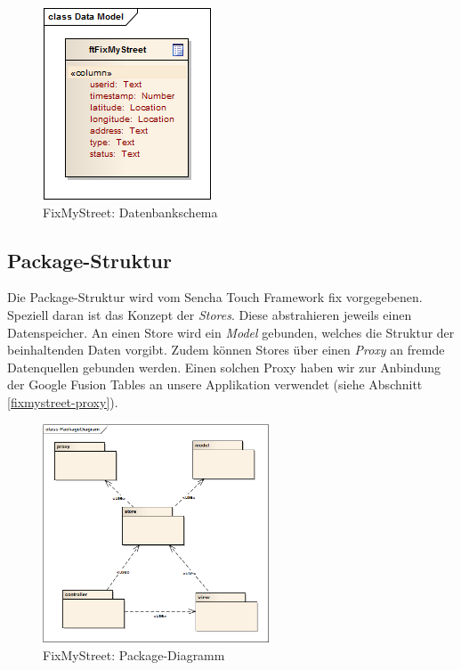 \begin{figure}[H]
	\centering
	\includegraphics[scale=0.8]{images/usecase2-fixmystreet/uml/fixmystreet-datamodel}
	\caption{FixMyStreet: Datenbankschema}
	\label{fixmystreet-datamodel}
\end{figure}

\subsection{Package-Struktur}
Die Package-Struktur wird vom Sencha Touch Framework fix vorgegebenen. Speziell daran ist das Konzept der \emph{Stores}. Diese abstrahieren jeweils einen Datenspeicher. An einen Store wird ein \emph{Model} gebunden, welches die Struktur der beinhaltenden Daten vorgibt. Zudem können Stores über einen \emph{Proxy} an fremde Datenquellen gebunden werden. Einen solchen Proxy haben wir zur Anbindung der Google Fusion Tables an unsere Applikation verwendet (siehe Abschnitt \ref{fixmystreet-proxy}).

\begin{figure}[H]
	\centering
	\includegraphics[width=0.6\textwidth]{images/usecase2-fixmystreet/uml/fixmystreet-packagediagram}
	\caption{FixMyStreet: Package-Diagramm}
	\label{fixmystreet-packagediagram}
\end{figure}

